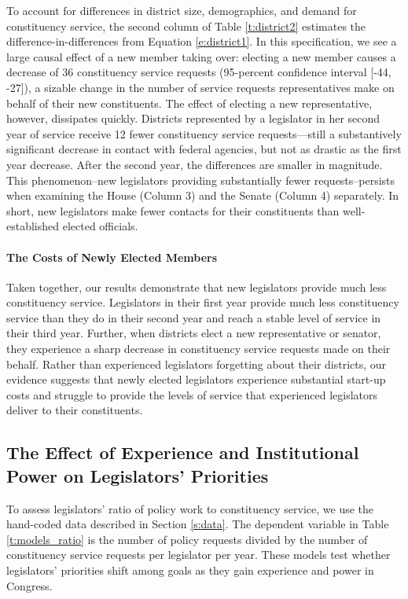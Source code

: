 \documentclass[12pt]{article}
\begin{document}
{To account for differences in district size, demographics, and demand for constituency service, the second column of Table \ref{t:district2} estimates the difference-in-differences from Equation \ref{e:district1}. In this specification, we see a large causal effect of a new member taking over: electing a new member causes a decrease of 36 constituency service requests (95-percent confidence interval [-44, -27]), a sizable change in the number of service requests representatives make on behalf of their new constituents. %
The effect of electing a new representative, however, dissipates quickly. Districts represented by a legislator in her second year of service receive 12 fewer constituency service requests---still a substantively significant decrease in contact with federal agencies, but not as drastic as the first year decrease. After the second year, the differences are smaller in magnitude. This phenomenon--new legislators providing substantially fewer requests--persists when examining the House (Column 3) and the Senate (Column 4) separately. In short, new legislators make fewer contacts for their constituents than well-established elected officials.  


\paragraph{The Costs of Newly Elected Members} Taken together, our results demonstrate that new legislators provide much less constituency service. Legislators in their first year provide much less constituency service than they do in their second year and reach a stable level of service in their third year. Further, when districts elect a new representative or senator, they experience a sharp decrease in constituency service requests made on their behalf. Rather than experienced legislators forgetting about their districts, our evidence suggests that newly elected legislators experience substantial start-up costs and struggle to provide the levels of service that experienced legislators deliver to their constituents.  


\subsection{The Effect of Experience and Institutional Power on Legislators' Priorities}\label{s:priority} 

To assess legislators' ratio of policy work to constituency service, we use the hand-coded data described in Section \ref{s:data}. The dependent variable in Table \ref{t:models_ratio} is the number of policy requests divided by the number of constituency service requests per legislator per year. These models test whether legislators' priorities shift among goals as they gain experience and power in Congress.

}
\end{document}
